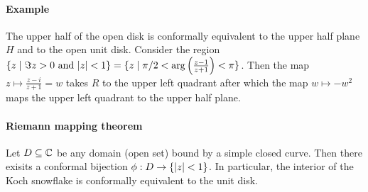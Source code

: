 \paragraph{Example}
The upper half of the open disk is conformally equivalent to the upper half plane $H$ and to the open unit disk.
Consider the region $\{ z \mid \Im z > 0 \text{ and } \lvert z\rvert < 1 \} = \{ z \mid \pi/2 < \arg \left(\frac{z-1}{z+1}\right) < \pi\}$. Then the map $z \mapsto \frac{z-i}{z+1} = w$ takes $R$ to the upper left quadrant after which the map $w \mapsto -w^2$ maps the upper left quadrant to the upper half plane.

\paragraph{Riemann mapping theorem}
Let $D \subseteq \mathbb{C}$ be any domain (open set) bound by a simple closed curve. Then there exisits a conformal bijection $\phi : D \rightarrow \{ \lvert z\rvert < 1 \}$. In particular, the interior of the Koch snowflake is conformally equivalent to the unit disk.



